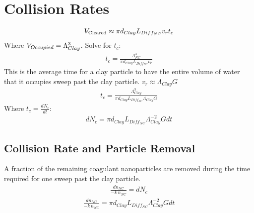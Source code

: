 \documentclass[letterpaper,10pt,english]{sphinxmanual}
\begin{document}
\section{Collision Rates}
\label{\detokenize{Rapid_Mix/RM_Derivations:collision-rates}}\label{\detokenize{Rapid_Mix/RM_Derivations:heading-collision-rates}}\begin{equation}\label{equation:Rapid_Mix/RM_Derivations:Rapid_Mix/RM_Derivations:5}
\begin{split}{\rlap{\kern.08em--}V_{\rm{Cleared}}} \approx \pi d_{Clay} L_{Diff_{NC}} v_r t_c\end{split}
\end{equation}
Where \(\rlap{\kern.08em--}V_{Occupied} = \Lambda_{Clay}^3\). Solve for \(t_c\):
\begin{equation}\label{equation:Rapid_Mix/RM_Derivations:Rapid_Mix/RM_Derivations:6}
\begin{split}t_c = \frac{\Lambda_{NC}^3}{\pi d_{Clay} L_{Diff_{NC}} v_r}\end{split}
\end{equation}
This is the average time for a clay particle to have the entire volume of water that it occupies sweep past the clay particle.
\(v_r \approx \Lambda_{Clay} G\)
\begin{equation}\label{equation:Rapid_Mix/RM_Derivations:Rapid_Mix/RM_Derivations:7}
\begin{split}t_c = \frac{\Lambda_{Clay}^3}{\pi d_{Clay} L_{Diff_{NC}} \Lambda_{Clay} G}\end{split}
\end{equation}
Where \(t_c = \frac{dN_c}{dt}\):
\begin{equation}\label{equation:Rapid_Mix/RM_Derivations:Rapid_Mix/RM_Derivations:8}
\begin{split}dN_c = \pi d_{Clay} L_{Diff_{NC}}{\Lambda^{-2}_{Clay}} G dt\end{split}
\end{equation}

\subsection{Collision Rate and Particle Removal}
\label{\detokenize{Rapid_Mix/RM_Derivations:collision-rate-and-particle-removal}}\label{\detokenize{Rapid_Mix/RM_Derivations:heading-collision-rate-and-particle-removal}}
A fraction of the remaining coagulant nanoparticles are removed during the time required for one sweep past the clay particle.
\begin{equation}\label{equation:Rapid_Mix/RM_Derivations:Rapid_Mix/RM_Derivations:9}
\begin{split}\frac{dn_{NC}}{ - k \, n_{NC}} = dN_c\end{split}
\end{equation}\begin{equation}\label{equation:Rapid_Mix/RM_Derivations:Rapid_Mix/RM_Derivations:10}
\begin{split}\frac{dn_{NC}}{ - k \, n_{NC}} = \pi d_{Clay} L_{Diff_{NC}}{\Lambda^{-2}_{Clay}} G dt\end{split}
\end{equation}
\end{document}
